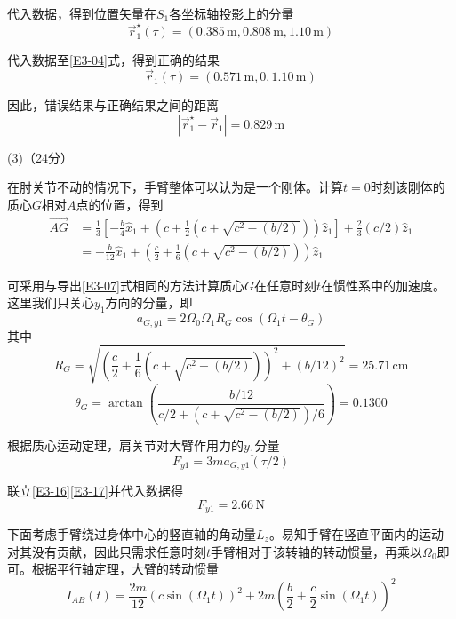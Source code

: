 \documentclass[10pt,a4paper,onecolumn,UTF8]{ctexart}
\begin{document}
	代入数据，得到位置矢量在$S_1$各坐标轴投影上的分量
	\begin{equation}
		\vec r_1^{\star}(\tau)=(0.385\,\text{m},0.808\,\text{m},1.10\,\text{m})
	\end{equation}
	
	代入数据至\eqref{E3-04}式，得到正确的结果
	\begin{equation}
		\vec r_1(\tau)=(0.571\,\text{m},0,1.10\,\text{m})
	\end{equation}
	
	因此，错误结果与正确结果之间的距离
	\begin{equation}
		|\vec r_1^{\star}-\vec r_1|=0.829\,\text{m}
	\end{equation}
	
	(3)（24分）
	
	在肘关节不动的情况下，手臂整体可以认为是一个刚体。计算$t=0$时刻该刚体的质心$G$相对$A$点的位置，得到
	\begin{equation}
		\begin{aligned}
			\overrightarrow{AG}&=\frac{1}{3}\left[-\frac b 4 \hat x_1+\left(c+\frac 1 2\left(c+\sqrt{c^2-\left(b/2\right)}\right)\right)\hat z_1\right]+\frac 2 3 (c/2)\hat z_1\\
			&=-\frac{b}{12}\hat x_1+\left(\frac c 2+\frac 1 6\left(c+\sqrt{c^2-\left(b/2\right)}\right)\right)\hat z_1
		\end{aligned}
	\end{equation}
	
	可采用与导出\eqref{E3-07}式相同的方法计算质心$G$在任意时刻$t$在惯性系中的加速度。这里我们只关心$y_1$方向的分量，即
	\begin{equation}\label{E3-16}
		a_{G,y1}=2\Omega_0\Omega_1R_G\cos(\Omega_1t-\theta_G)
	\end{equation}
	其中
	$$R_G=\sqrt{\left(\frac c 2+\frac 1 6\left(c+\sqrt{c^2-\left(b/2\right)}\right)\right)^2+(b/12)^2}=25.71\,\text{cm}$$
	$$\theta_G=\arctan\left(\frac{b/12}{c/2+\left(c+\sqrt{c^2-\left(b/2\right)}\right)/6}\right)=0.1300$$
	
	根据质心运动定理，肩关节对大臂作用力的$y_1$分量
	\begin{equation}\label{E3-17}
		F_{y1}=3ma_{G,y1}(\tau/2)
	\end{equation}
	
	联立\eqref{E3-16}\eqref{E3-17}并代入数据得
	\begin{equation}\label{E3-18}
		F_{y1}=2.66\,\text{N}
	\end{equation}
	
	下面考虑手臂绕过身体中心的竖直轴的角动量$L_z$。易知手臂在竖直平面内的运动对其没有贡献，因此只需求任意时刻$t$手臂相对于该转轴的转动惯量，再乘以$\Omega_0$即可。根据平行轴定理，大臂的转动惯量
	\begin{equation}\label{E3-19}
		I_{AB}(t)=\frac{2m}{12}(c\sin(\Omega_1t))^2+2m\left(\frac b 2+\frac c 2\sin(\Omega_1t)\right)^2
	\end{equation}
	
\end{document}
